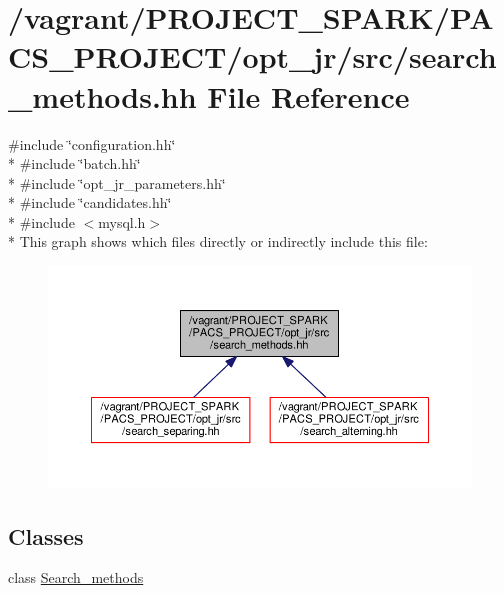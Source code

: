 \hypertarget{search__methods_8hh}{\section{/vagrant/\-P\-R\-O\-J\-E\-C\-T\-\_\-\-S\-P\-A\-R\-K/\-P\-A\-C\-S\-\_\-\-P\-R\-O\-J\-E\-C\-T/opt\-\_\-jr/src/search\-\_\-methods.hh File Reference}
\label{search__methods_8hh}
}
{\ttfamily \#include \char`\"{}configuration.\-hh\char`\"{}}\\*
{\ttfamily \#include \char`\"{}batch.\-hh\char`\"{}}\\*
{\ttfamily \#include \char`\"{}opt\-\_\-jr\-\_\-parameters.\-hh\char`\"{}}\\*
{\ttfamily \#include \char`\"{}candidates.\-hh\char`\"{}}\\*
{\ttfamily \#include $<$mysql.\-h$>$}\\*
This graph shows which files directly or indirectly include this file\-:\nopagebreak
\begin{figure}[H]
\begin{center}
\leavevmode
\includegraphics[width=350pt]{search__methods_8hh__dep__incl}
\end{center}
\end{figure}
\subsection*{Classes}
\begin{DoxyCompactItemize}
\item 
class \hyperlink{classSearch__methods}{Search\-\_\-methods}
\end{DoxyCompactItemize}
